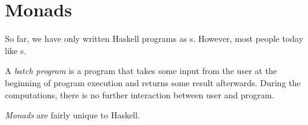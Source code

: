 \section{Monads}\label{sec:Monads}
So far, we have only written Haskell programs as s.
However, most people today like s.

\begin{definition}\label{def:Batch_Program}
  A \emph{batch program} is a program that takes some input from the user at the beginning of program execution and returns some result afterwards.
  During the computations, there is no further interaction between user and program.
\end{definition}

\begin{definition}[Monad]\label{def:Monad}
  \emph{Monads} are fairly unique to Haskell.
\end{definition}

